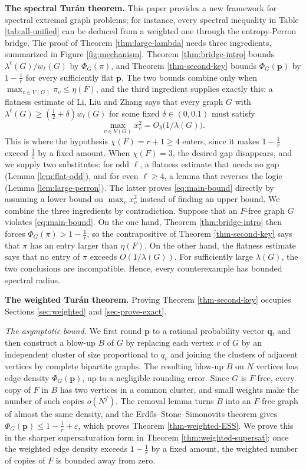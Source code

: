 \documentclass[11pt, a4paper]{article}
\theoremstyle{definition}
\theoremstyle{plain}
\renewcommand{\le}{\leqslant}
\renewcommand{\ge}{\geqslant}
\begin{document}
\noindent
{\bf The spectral Tur\'an theorem.} 
This paper provides a new framework for spectral extremal graph problems; for instance, every spectral inequality in Table \ref{tab:all-unified} can be deduced from a weighted one through the entropy-Perron bridge.  
The proof of Theorem \ref{thm:large-lambda} needs three  ingredients, summarized in Figure \ref{fig:mechanism}. 
Theorem \ref{thm:bridge-intro} bounds $\lambda^{\ell}(G)/w_\ell (G)$ by
$\Phi_G(\pi )$, and Theorem \ref{thm-second-key} bounds $\Phi_G(\bm{p})$ by
$1-\frac1r$ for every sufficiently flat $\bm{p}$. 
The two bounds combine only when 
$\max_{v\in V(G)} \pi_v\le \eta (F)$, and the third ingredient supplies exactly this: a flatness estimate of Li, Liu and Zhang \cite[Lemma 3.1]{LLZ-ESS} says that every
graph $G$ with $\lambda^{\ell}(G) \ge (\frac12+\delta )w_\ell (G)$ for some fixed $\delta \in (0,0.1)$ must  satisfy
\[
  \max_{v\in V(G)}x_v^{2}=O_\delta \bigl(1/\lambda (G)\bigr).
\]
This is where  the hypothesis $\chi (F)=r+1\ge 4$ enters, since it makes $1-\frac1r$ exceed
$\frac12$ by a fixed amount.  
When $\chi (F)=3$, the desired gap disappears, and we supply two substitutes: for odd $\ell$, a flatness estimate that needs no gap (Lemma \ref{lem:flat-odd}), and for even $\ell \ge 4$, a lemma that reverses the logic (Lemma \ref{lem:large-perron}). The latter proves \eqref{eq:main-bound} directly by assuming a lower bound on $\max_v x_v^2$ instead of finding an upper bound. 
We combine the three ingredients by contradiction. 
Suppose that an $F$-free graph $G$ violates
\eqref{eq:main-bound}. On the one hand, Theorem \ref{thm:bridge-intro} then
forces $\Phi_G(\pi )>1-\frac1r$, so the contrapositive of Theorem
\ref{thm-second-key} says that $\pi$ has an entry larger than $\eta (F)$. On the
other hand, the flatness estimate says that no entry of $\pi$ exceeds
$O(1/\lambda (G))$. For sufficiently large $\lambda (G)$, 
the two conclusions are incompatible. 
 Hence,  every counterexample has bounded spectral radius. 


\smallskip
\noindent
{\bf The weighted Tur\'an theorem.}
Proving Theorem \ref{thm-second-key} occupies Sections \ref{sec:weighted} and
\ref{sec-prove-exact}.

\emph{The asymptotic bound.} 
We first round $\bm{p}$ to a rational probability vector $\bm{q}$, and then construct a blow-up $B$ of $G$ by 
replacing each vertex $v$ of $G$ by an independent cluster of size proportional to
$q_v$ and joining the clusters of adjacent vertices 
by complete bipartite graphs. The resulting
blow-up $B$ on $N$ vertices has edge density $\Phi_G(\bm{p})$, up to a
negligible rounding error. Since $G$ is $F$-free, every copy of $F$ in $B$ has
two vertices in a common cluster, and small weights make the number of such
copies $o(N^{f})$. The removal lemma turns $B$ into an $F$-free graph of
almost the same density, and the Erd\H{o}s--Stone--Simonovits theorem gives
$\Phi_G(\bm{p})\le 1-\frac1r+\varepsilon$, which proves Theorem
\ref{thm-weighted-ESS}. We prove this in the sharper supersaturation form
in Theorem \ref{thm:weighted-supersat}: once the weighted edge density exceeds
$1-\frac1r$ by a fixed amount, the weighted number of copies of $F$ is bounded
away from zero.
\end{document}
